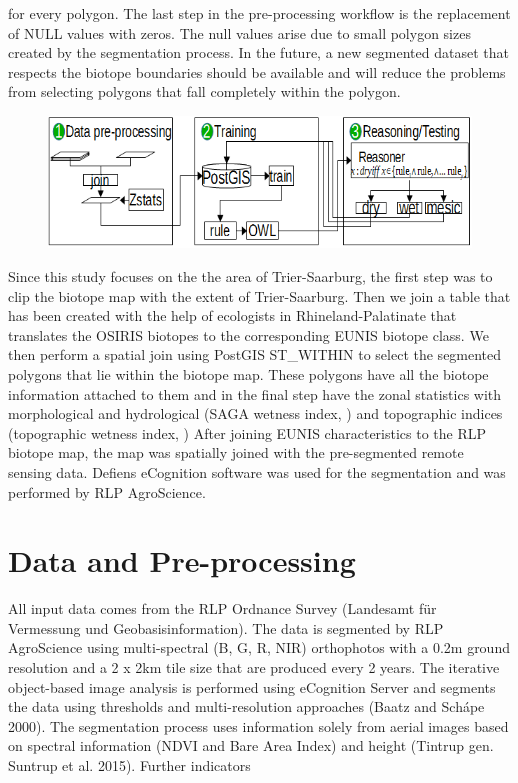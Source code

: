 \documentclass[authoryear, review,12pt,number]{elsarticle}
\begin{document}
for every polygon. The last step in the pre-processing workflow is the
replacement of NULL values with zeros. The null values arise due to small
polygon sizes created by the segmentation process. In the future, a new
segmented dataset that respects the biotope boundaries should be available and
will reduce the problems from selecting polygons that fall completely within the
polygon.
\begin{figure}
  \includegraphics[width=\linewidth]{diagrams/workflow_overview2.png}
\caption{}
\end{figure}
Since this study focuses on the the area of Trier-Saarburg, the first step was
to clip the biotope map with the extent of Trier-Saarburg. Then we join a table
that has been created with the help of ecologists in Rhineland-Palatinate that
translates the OSIRIS biotopes to the corresponding EUNIS biotope class. We then
perform a spatial join using PostGIS ST\_WITHIN to select the segmented 
polygons that lie within the biotope map. These polygons have all the biotope 
information
attached to them and in the final step have the zonal statistics with
morphological and hydrological (SAGA wetness index, ) and topographic indices 
(topographic wetness
index, )
After joining EUNIS characteristics to the RLP biotope map, the map was 
spatially joined with the pre-segmented remote sensing data. Defiens eCognition
software was used for the segmentation and was performed by RLP AgroScience. 


\section{Data and Pre-processing}
All input data comes from the RLP Ordnance Survey (Landesamt f\"ur Vermessung 
und Geobasisinformation). The data is segmented by RLP AgroScience using
multi-spectral (B, G, R, NIR) orthophotos with a 0.2m ground resolution and a
2 x 2km tile size that are produced every 2 years. The iterative object-based
image analysis is performed using eCognition Server and segments
the data using thresholds and multi-resolution approaches (Baatz and
Sch\'ape 2000). The segmentation process uses information solely from aerial
images based on spectral information (NDVI and Bare Area Index) and height
(Tintrup gen. Suntrup et al. 2015). Further indicators 
\end{document}
